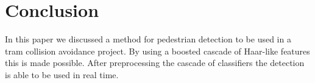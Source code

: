 \documentclass{article}
\begin{document}
\section{Conclusion}
In this paper we discussed a method for pedestrian detection to be used in a tram collision avoidance project. By using a boosted cascade of Haar-like features this is made possible. After preprocessing the cascade of classifiers the detection is able to be used in real time.


\end{document}
